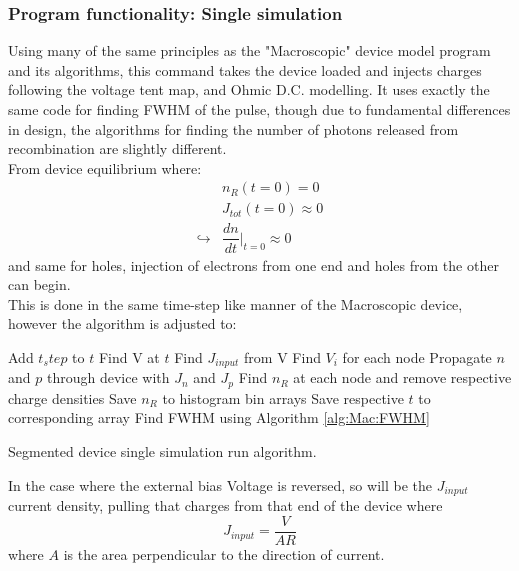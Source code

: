\documentclass[titlepage]{article}
\begin{document}
\subsubsection{Program functionality: Single simulation}
Using many of the same principles as the "Macroscopic" device model program and its algorithms, this command takes the device loaded and injects charges following the voltage tent map, and Ohmic D.C. modelling. It uses exactly the same code for finding FWHM of the pulse, though due to fundamental differences in design, the algorithms for finding the number of photons released from recombination are slightly different.\\
From device equilibrium where:
\begin{eqnarray}
	&n_R(t=0) = 0\\
	&J_{tot}(t=0) \approx 0\\
	\hookrightarrow &\dfrac{dn}{dt}\Big|_{t=0} \approx 0
\end{eqnarray}
and same for holes, injection of electrons from one end and holes from the other can begin.\\
This is done in the same time-step like manner of the Macroscopic device, however the algorithm is adjusted to:\\
\begin{algorithm}[H]
	{
		Add $t_step$ to $t$\;
		Find V at $t$\;
		Find $J_{input}$ from V\;
		Find $V_i$ for each node\;
		Propagate $n$ and $p$ through device with $J_n$ and $J_p$\;
		Find $n_R$ at each node and remove respective charge densities\;
		Save $n_R$ to histogram bin arrays\;
		Save respective $t$ to corresponding array\;
	}
	Find FWHM using Algorithm \ref{alg:Mac:FWHM}\;
	\caption{\label{alg:Mic:Inner} Segmented device single simulation run algorithm.}
\end{algorithm}
In the case where the external bias Voltage is reversed, so will be the $J_{input}$ current density, pulling that charges from that end of the device where 
\begin{equation}
	J_{input} = \frac{V}{AR}
\end{equation}
where $A$ is the area perpendicular to the direction of current.\\
\end{document}
